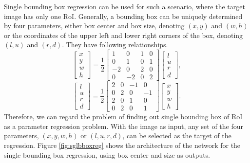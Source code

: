 Single bounding box regression can be used for such a scenario, where the target image has only one RoI. Generally, a bounding box can be uniquely determined by four parameters, either box center and box size, denoting $(x, y)$ and $(w, h)$ or the coordinates of the upper left and lower right corners of the box, denoting $(l, u)$ and $(r, d)$. They have following relationships.
\begin{equation}
	\left[\begin{array}{c}
		x\\y\\w\\h
	\end{array}\right]=\frac{1}{2}\left[\begin{array}{cccc}
		1 & 0 & 1 & 0 \\
		0 & 1 & 0 & 1 \\
		-2 & 0 & 2 & 0 \\
		0 & -2 & 0 & 2
	\end{array}\right]\left[\begin{array}{c}
		l\\u\\r\\d
	\end{array}\right],
\end{equation}
\begin{equation}
	\left[\begin{array}{c}
		l\\u\\r\\d
	\end{array}\right]=\frac{1}{2}\left[\begin{array}{cccc}
		2 & 0 & -1 & 0 \\
		0 & 2 & 0 & -1 \\
		2 & 0 & 1 & 0 \\
		0 & 2 & 0 & 1
	\end{array}\right]\left[\begin{array}{c}
		x\\y\\w\\h
	\end{array}\right].
\end{equation}
Therefore, we can regard the problem of finding out single bounding box of RoI as a parameter regression problem. With the image as input, any set of the four parameters, $(x, y, w, h)$ or $(l, u, r, d)$, can be selected as the target of the regression. Figure \ref{fig:sglbboxreg} shows the architecture of the network for the single bounding box regression, using box center and size as outputs.

